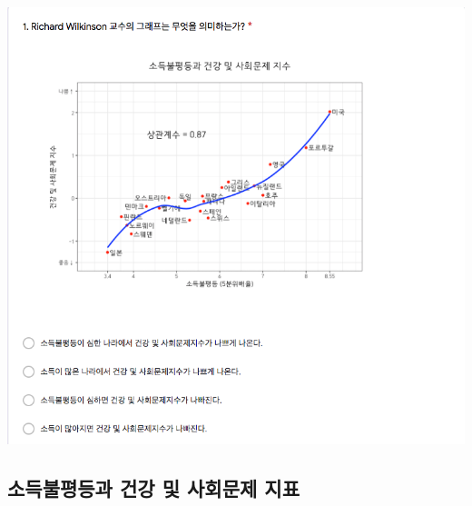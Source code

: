 \documentclass[
]{book}
\begin{document}
\includegraphics[width=0.75\linewidth]{./pics/Quiz201026_01}

\subsection{소득불평등과 건강 및 사회문제 지표}\label{uxc18cuxb4dduxbd88uxd3c9uxb4f1uxacfc-uxac74uxac15-uxbc0f-uxc0acuxd68cuxbb38uxc81c-uxc9c0uxd45c}
\end{document}
